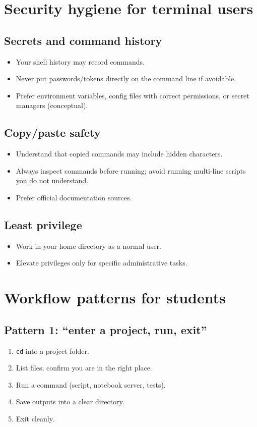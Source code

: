 \section{Security hygiene for terminal users}
\subsection{Secrets and command history}
\begin{itemize}
\item Your shell history may record commands.
\item Never put passwords/tokens directly on the command line if avoidable.
\item Prefer environment variables, config files with correct permissions, or secret managers (conceptual).
\end{itemize}

\subsection{Copy/paste safety}
\begin{itemize}
\item Understand that copied commands may include hidden characters.
\item Always inspect commands before running; avoid running multi-line scripts you do not understand.
\item Prefer official documentation sources.
\end{itemize}

\subsection{Least privilege}
\begin{itemize}
\item Work in your home directory as a normal user.
\item Elevate privileges only for specific administrative tasks.
\end{itemize}

\section{Workflow patterns for students}
\subsection{Pattern 1: ``enter a project, run, exit''}
\begin{enumerate}
\item \texttt{cd} into a project folder.
\item List files; confirm you are in the right place.
\item Run a command (script, notebook server, tests).
\item Save outputs into a clear directory.
\item Exit cleanly.
\end{enumerate}

